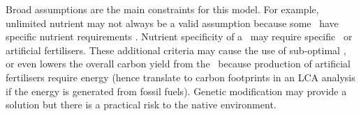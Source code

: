 \documentclass[env.tex]{subfiles}
\begin{document}
Broad assumptions are the main constraints for this model.  For example, unlimited nutrient may not always be a valid assumption because some \phy\ have specific nutrient requirements \autocite{kazamia2012mutualistic}.  Nutrient specificity of a \phy\ may require specific \bac\ or artificial fertilisers.  These additional criteria may cause the use of sub-optimal \bac, or even lowers the overall carbon yield from the \pbs\ because production of artificial fertilisers require energy (hence translate to carbon footprints in an LCA analysis if the energy is generated from fossil fuels).  Genetic modification may provide a solution but there is a practical risk to the native environment.
\end{document}
